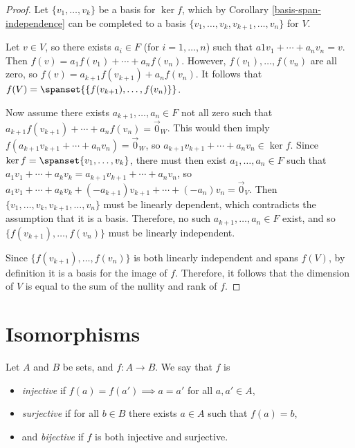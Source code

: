 \documentclass[12pt]{article}
\begin{document}
\begin{proof}
    Let $\{v_1, \ldots, v_k\}$ be a basis for $\ker f$, which by Corollary \ref{basis-span-independence} can be completed to a basis $\{v_1, \ldots, v_k, v_{k+1}, \ldots, v_n\}$ for $V$.

    Let $v \in V$, so there exists $a_i \in F$ (for $i = 1, \ldots, n$) such that $a1v_1 + \cdots + a_nv_n = v$. Then $f(v) = a_1f(v_1) + \cdots + a_nf(v_n)$. However, $f(v_1), \ldots, f(v_n)$ are all zero, so $f(v) = a_{k+1}f(v_{k+1}) + a_nf(v_n)$. It follows that $f(V) = \spanset{\{f(v_{k+1}), \ldots, f(v_n)\}}$.

    Now assume there exists $a_{k+1}, \ldots, a_n \in F$ not all zero such that $a_{k+1}f(v_{k+1}) + \cdots + a_nf(v_n) = \vec{0}_W$. This would then imply $f(a_{k+1}v_{k+1} + \cdots + a_nv_n) = \vec{0}_W$, so $a_{k+1}v_{k+1} + \cdots + a_nv_n \in \ker f$. Since $\ker f = \spanset{v_1, \ldots, v_k}$, there must then exist $a_1, \ldots, a_n \in F$ such that $a_1v_1 + \cdots + a_kv_k = a_{k+1}v_{k+1} + \cdots + a_nv_n$, so $a_1v_1 + \cdots + a_kv_k + (-a_{k+1})v_{k+1} + \cdots + (-a_n)v_n = \vec{0}_V$. Then $\{v_1, \ldots, v_k, v_{k+1}, \ldots, v_n\}$ must be linearly dependent, which contradicts the assumption that it is a basis. Therefore, no such $a_{k+1}, \ldots, a_n \in F$ exist, and so $\{f(v_{k+1}), \ldots, f(v_n)\}$ must be linearly independent.

    Since $\{f(v_{k+1}), \ldots, f(v_n)\}$ is both linearly independent and spans $f(V)$, by definition it is a basis for the image of $f$. Therefore, it follows that the dimension of $V$ is equal to the sum of the nullity and rank of $f$.
\end{proof}

\section{Isomorphisms}

\begin{defn}
    Let $A$ and $B$ be sets, and $f: A \to B$. We say that $f$ is \begin{itemize}
        \item \emph{injective} if $f(a) = f(a') \implies a = a'$ for all $a, a' \in A$,
        \item \emph{surjective} if for all $b \in B$ there exists $a \in A$ such that $f(a) = b$,
        \item and \emph{bijective} if $f$ is both injective and surjective.
    \end{itemize}
\end{defn}
\end{document}
